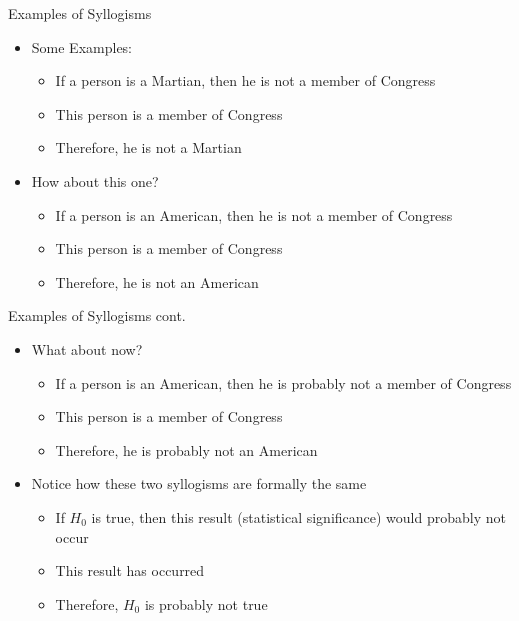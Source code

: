 \documentclass[aspectratio=169, 12pt]{beamer}
\begin{document}
\begin{frame}{Examples of Syllogisms}
  \begin{itemize}
  \item Some Examples:
    \begin{itemize}
    \item If a person is a Martian, then he is not a member of Congress
    \item This person is a member of Congress
    \item Therefore, he is not a Martian
    \end{itemize}
  \item How about this one?
    \begin{itemize}
    \item If a person is an American, then he is not a member of Congress  %
    \item This person is a member of Congress
    \item Therefore, he is not an American
    \end{itemize}
  \end{itemize}
\end{frame}

\begin{frame}{Examples of Syllogisms cont.}
  \begin{itemize}
  \item What about now?
    \begin{itemize}
    \item If a person is an American, then he is probably not a member of Congress %
    \item This person is a member of Congress
    \item Therefore, he is probably not an American
    \end{itemize}
  \item Notice how these two syllogisms are formally the same
    \begin{itemize}
    \item If $H_0$ is true, then this result (statistical significance) would probably not occur %
    \item This result has occurred
    \item Therefore, $H_0$ is probably not true
    \end{itemize}
  \end{itemize}
\end{frame}
\end{document}
